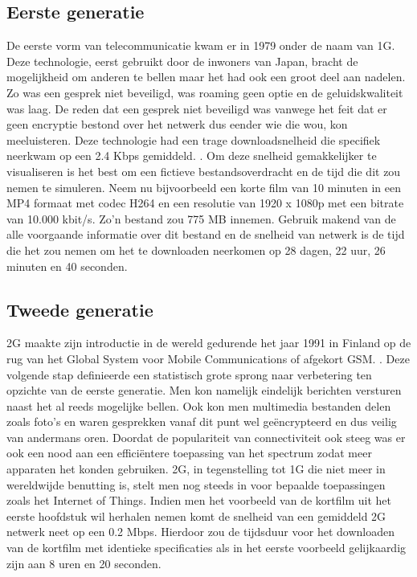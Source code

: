 \subsection{Eerste generatie}

De eerste vorm van telecommunicatie kwam er in 1979 onder de naam van 1G. Deze technologie, eerst gebruikt door de inwoners van Japan, bracht de mogelijkheid om anderen te bellen maar het had ook een groot deel aan nadelen. Zo was een gesprek niet beveiligd, was roaming geen optie en de geluidskwaliteit was laag.
De reden dat een gesprek niet beveiligd was vanwege het feit dat er geen encryptie bestond over het netwerk dus eender wie die wou, kon meeluisteren. Deze technologie had een trage downloadsnelheid die specifiek neerkwam op een 2.4 Kbps gemiddeld. \autocite{Galazzo2020}. Om deze snelheid gemakkelijker te visualiseren is het best om een fictieve bestandsoverdracht en de tijd die dit zou nemen te simuleren. Neem nu bijvoorbeeld een korte film van 10 minuten in een MP4 formaat met codec H264 en een resolutie van 1920 x 1080p met een bitrate van 10.000 kbit/s. Zo'n bestand zou 775 MB innemen. \autocite{Helme2019} Gebruik makend van de alle voorgaande informatie over dit bestand en de snelheid van netwerk is de tijd die het zou nemen om het te downloaden neerkomen op 28 dagen, 22 uur, 26 minuten en 40 seconden.

\subsection{Tweede generatie}

2G maakte zijn introductie in de wereld gedurende het jaar 1991 in Finland op de rug van het Global System voor Mobile Communications of afgekort GSM. \autocite{Galazzo2020}. Deze volgende stap definieerde een statistisch grote sprong naar verbetering ten opzichte van de eerste generatie. Men kon namelijk eindelijk berichten versturen naast het al reeds mogelijke bellen. Ook kon men multimedia bestanden delen zoals foto's en waren gesprekken vanaf dit punt wel geëncrypteerd en dus veilig van andermans oren. Doordat de populariteit van connectiviteit ook steeg was er ook een nood aan een efficiëntere toepassing van het spectrum zodat meer apparaten het konden gebruiken. 2G, in tegenstelling tot 1G die niet meer in wereldwijde benutting is, stelt men nog steeds in voor bepaalde toepassingen zoals het Internet of Things. \autocite{Henke2021} Indien men het voorbeeld van de kortfilm uit het eerste hoofdstuk wil herhalen nemen komt de snelheid van een gemiddeld 2G netwerk neet op een 0.2 Mbps. \autocite{Galazzo2020} Hierdoor zou de tijdsduur voor het downloaden van de kortfilm met identieke specificaties als in het eerste voorbeeld gelijkaardig zijn aan 8 uren en 20 seconden. \autocite{Wooding2024}

